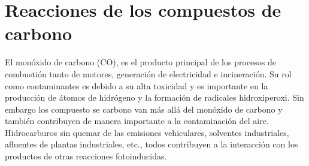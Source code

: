 \section{Reacciones de los compuestos de carbono}
El monóxido de carbono (CO), es el producto principal de los procesos de combustión tanto de motores, generación de electricidad e incineración. Su rol como contaminantes es debido a su alta toxicidad y es importante en la producción de átomos de hidrógeno y la formación de radicales hidroxiperoxi. Sin embargo los compuesto se carbono van más allá del monóxido de carbono y también contribuyen de manera importante a la contaminación del aire. Hidrocarburos sin quemar de las emisiones vehiculares, solventes industriales, afluentes de plantas industriales, etc., todos contribuyen a la interacción con los productos de otras reacciones fotoinducidas.

